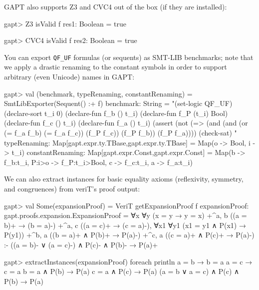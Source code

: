 \documentclass[a4paper,11pt]{book}
\begin{document}
GAPT also supports Z3 and CVC4 out of the box (if they are installed):
\begin{clilisting}
gapt> Z3 isValid f
res1: Boolean = true

gapt> CVC4 isValid f
res2: Boolean = true

\end{clilisting}

You can export \verb,QF_UF, formulas (or sequents) as SMT-LIB benchmarks;
note that we apply a drastic renaming to the constant symbols in order to
support arbitrary (even Unicode) names in GAPT:
\begin{clilisting}
gapt> val (benchmark, typeRenaming, constantRenaming) = SmtLibExporter(Sequent() :+ f)
benchmark: String =
"(set-logic QF_UF)
(declare-sort t_i 0)
(declare-fun f_b () t_i)
(declare-fun f_P (t_i) Bool)
(declare-fun f_c () t_i)
(declare-fun f_a () t_i)
(assert
  (not
    (=> (and (and (or (= f_a f_b) (= f_a f_c)) (f_P f_c)) (f_P f_b))
      (f_P f_a))))
(check-sat)
"
typeRenaming: Map[gapt.expr.ty.TBase,gapt.expr.ty.TBase] = Map(o -> Bool, i -> t_i)
constantRenaming: Map[gapt.expr.Const,gapt.expr.Const] = Map(b -> f_b:t_i, P:i>o -> f_P:t_i>Bool, c -> f_c:t_i, a -> f_a:t_i)

\end{clilisting}

We can also extract instances for basic equality axioms (reflexivity, symmetry,
and congruences) from veriT's proof output:
\begin{clilisting}
gapt> val Some(expansionProof) = VeriT getExpansionProof f
expansionProof: gapt.proofs.expansion.ExpansionProof =
∀x ∀y (x = y → y = x)
  +^{a, b} ((a = b)+ → (b = a)-)
  +^{a, c} ((a = c)+ → (c = a)-),
∀x1 ∀y1 (x1 = y1 ∧ P(x1) → P(y1))
  +^{b, a} ((b = a)+ ∧ P(b)+ → P(a)-)
  +^{c, a} ((c = a)+ ∧ P(c)+ → P(a)-)
:-
((a = b)- ∨ (a = c)-) ∧ P(c)- ∧ P(b)- → P(a)+

gapt> extractInstances(expansionProof) foreach println
a = b → b = a
a = c → c = a
b = a ∧ P(b) → P(a)
c = a ∧ P(c) → P(a)
(a = b ∨ a = c) ∧ P(c) ∧ P(b) → P(a)

\end{clilisting}
\end{document}
